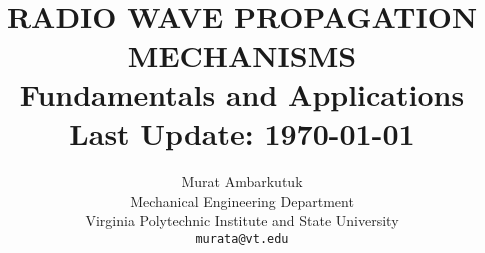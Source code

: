 \title{
    \\ [2.0cm]
    \HRule{0.5pt} \\
    \LARGE \textbf{\uppercase{Radio Wave Propagation Mechanisms}} \\
    \normalsize{Fundamentals and Applications}
    \HRule{2pt} \\ [0.5cm]
    \normalsize{Last Update:} \today \vspace*{5\baselineskip}
}

\author{
    Murat Ambarkutuk \\
    Mechanical Engineering Department \\
    Virginia Polytechnic Institute and State University \\
    \texttt{murata@vt.edu}
}

\maketitle
